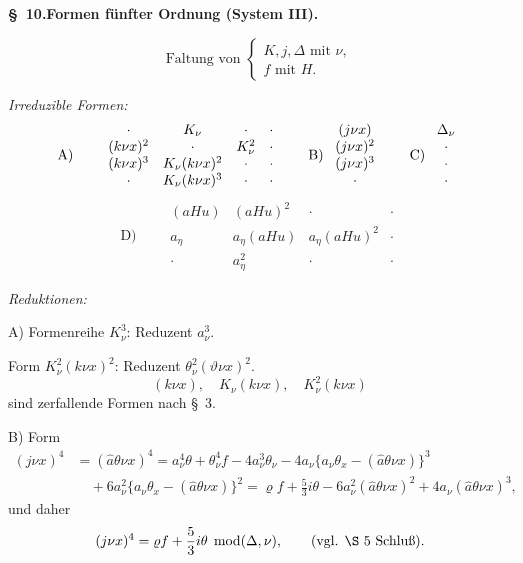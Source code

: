 \documentclass[11pt]{article}
\newcommand{\A}{\Delta}
\newcommand{\R}{\varrho}
\newcommand{\hata}{\widehat{a}}
\newcommand{\modu}[1]{\;\operatorname{mod} #1}
\begin{document}
\begin{center}
\textbf{\S\ 10.\quad Formen fünfter Ordnung (System III).}
\end{center}

\[
\text{Faltung von }\left\{\begin{array}{l}
K,j,\A \text{ mit }\nu,\\
f\text{ mit }H.
\end{array}\right.
\]

\noindent\emph{Irreduzible Formen:}
\[
\begin{array}{c@{\qquad}c@{\qquad}c@{\qquad}c}
\text{A)} & \begin{array}{cccc}
\cdot&K_\nu&\cdot&\cdot\\
(k\nu x)^2&\cdot&K_\nu^2&\cdot\\
(k\nu x)^3&K_\nu(k\nu x)^2&\cdot&\cdot\\
\cdot&K_\nu(k\nu x)^3&\cdot&\cdot
\end{array}
&
\text{B)}\ \begin{array}{c}(j\nu x)\\(j\nu x)^2\\(j\nu x)^3\\ \cdot\end{array}
&
\text{C)}\ \begin{array}{c}\A_\nu\\\cdot\\\cdot\\\cdot\end{array}
\end{array}
\]
\[
\text{D)}\qquad
\begin{array}{cccc}
(aHu)&(aHu)^2&\cdot&\cdot\\
a_\eta&a_\eta(aHu)&a_\eta(aHu)^2&\cdot\\
\cdot&a_\eta^2&\cdot&\cdot
\end{array}
\]

\noindent\emph{Reduktionen:}

\noindent A) Formenreihe $K_\nu^3$: Reduzent $a_\nu^3$.

Form $K_\nu^2(k\nu x)^2$: Reduzent $\theta_\nu^2(\vartheta\nu x)^2$.
\[
(k\nu x),\quad K_\nu(k\nu x),\quad K_\nu^2(k\nu x)
\]
sind zerfallende Formen nach \S\ 3.

\noindent B) Form
\[
\begin{aligned}
(j\nu x)^4&=(\hata\theta\nu x)^4
=a_\nu^4\theta+\theta_\nu^4 f-4a_\nu^3\theta_\nu
-4a_\nu\{a_\nu\theta_x-(\hata\theta\nu x)\}^3\\
&\quad+6a_\nu^2\{a_\nu\theta_x-(\hata\theta\nu x)\}^2
=\R f+\frac53 i\theta-6a_\nu^2(\hata\theta\nu x)^2
+4a_\nu(\hata\theta\nu x)^3,
\end{aligned}
\]
und daher
\[
(j\nu x)^4=\R f+\frac53 i\theta\modu{(\A,\nu)},\qquad (\text{vgl. \S\ 5 Schluß}).
\]
\end{document}
